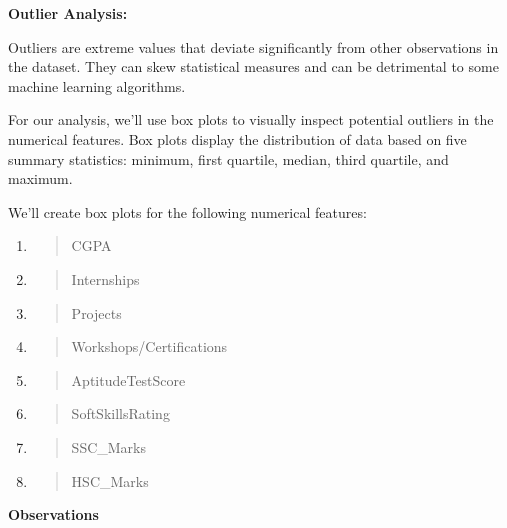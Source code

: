 \documentclass[]{article}
\begin{document}
\textbf{Outlier Analysis:}

Outliers are extreme values that deviate significantly from other
observations in the dataset. They can skew statistical measures and can
be detrimental to some machine learning algorithms.

For our analysis, we'll use box plots to visually inspect potential
outliers in the numerical features. Box plots display the distribution
of data based on five summary statistics: minimum, first quartile,
median, third quartile, and maximum.

We'll create box plots for the following numerical features:

\begin{enumerate}
\def\labelenumi{\arabic{enumi}.}
\item
  \begin{quote}
  CGPA
  \end{quote}
\item
  \begin{quote}
  Internships
  \end{quote}
\item
  \begin{quote}
  Projects
  \end{quote}
\item
  \begin{quote}
  Workshops/Certifications
  \end{quote}
\item
  \begin{quote}
  AptitudeTestScore
  \end{quote}
\item
  \begin{quote}
  SoftSkillsRating
  \end{quote}
\item
  \begin{quote}
  SSC\_Marks
  \end{quote}
\item
  \begin{quote}
  HSC\_Marks
  \end{quote}
\end{enumerate}

\textbf{Observations}
\end{document}
